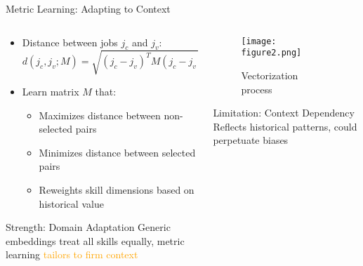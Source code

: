 \documentclass{beamer}
\begin{document}
\begin{frame}{Metric Learning: Adapting to Context}
\begin{columns}
\begin{column}{0.48\textwidth}
\begin{itemize}
    \item Distance between jobs $j_c$ and $j_v$:
    \begin{equation}
    d(j_c, j_v; M) = \sqrt{(j_c - j_v)^T M(j_c - j_v)}
    \end{equation}
    
    \item Learn matrix $M$ that:
    \begin{itemize}
        \item Maximizes distance between non-selected pairs
        \item Minimizes distance between selected pairs
        \item Reweights skill dimensions based on historical value
    \end{itemize}
\end{itemize}

\begin{block}{Strength: Domain Adaptation}
Generic embeddings treat all skills equally, metric learning \textcolor{orange}{tailors to firm context}
\end{block}
\end{column}
\begin{column}{0.48\textwidth}
\begin{figure}
\centering
\texttt{[image: figure2.png]}
\caption*{Vectorization process}
\end{figure}

\begin{block}{Limitation: Context Dependency}
Reflects historical patterns, could perpetuate biases
\end{block}
\end{column}
\end{columns}
\end{frame}
\end{document}
